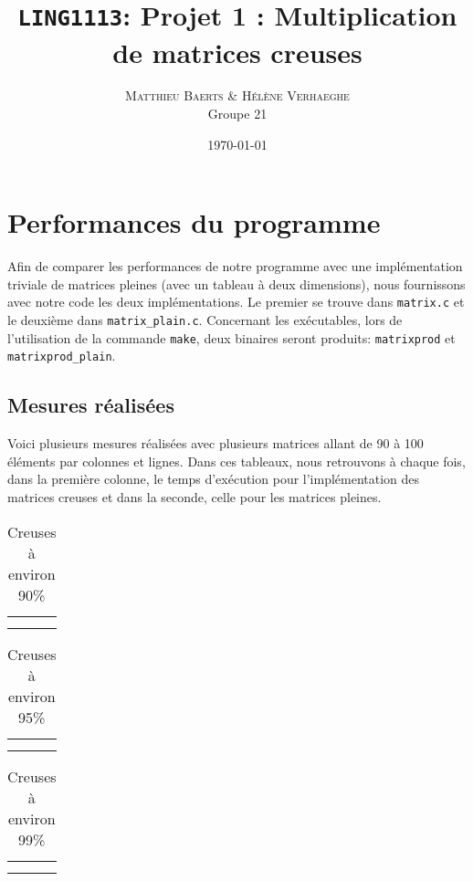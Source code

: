 \documentclass[a4paper]{scrartcl}
\date{\today} %
\title{\texttt{LING1113}: Projet 1 : Multiplication de matrices creuses}
\author{\textsc{Matthieu Baerts} \& \textsc{Hélène Verhaeghe}\\Groupe 21}
\begin{document}
\maketitle

\section{Performances du programme}
Afin de comparer les performances de notre programme avec une implémentation triviale de matrices pleines (avec un tableau à deux dimensions), nous fournissons avec notre code les deux implémentations. Le premier se trouve dans \texttt{matrix.c} et le deuxième dans \texttt{matrix\_plain.c}. Concernant les exécutables, lors de l'utilisation de la commande \texttt{make}, deux binaires seront produits: \texttt{matrixprod} et \texttt{matrixprod\_plain}.

\subsection{Mesures réalisées}
Voici plusieurs mesures réalisées avec plusieurs matrices allant de 90 à 100 éléments par colonnes et lignes. Dans ces tableaux, nous retrouvons à chaque fois, dans la première colonne, le temps d'exécution pour l'implémentation des matrices creuses et dans la seconde, celle pour les matrices pleines.

\begin{table}[H]
    \caption{Creuses à environ 90\%}
    \label{tab:10}
    \begin{center}
        \begin{tabular}{cc}
             & \\
             & \\
        \end{tabular}
    \end{center}
\end{table}

\begin{table}[H]
    \caption{Creuses à environ 95\%}
    \label{tab:}
    \begin{center}
        \begin{tabular}{cc}
             & \\
             & \\
        \end{tabular}
    \end{center}
\end{table}

\begin{table}[H]
    \caption{Creuses à environ 99\%}
    \label{tab:}
    \begin{center}
        \begin{tabular}{cc}
             & \\
             & \\
        \end{tabular}
    \end{center}
\end{table}
\end{document}
